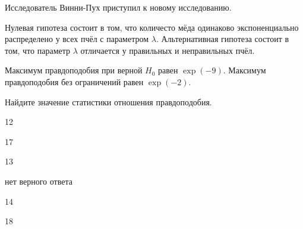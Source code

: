 
\begin{question}
Исследователь Винни-Пух приступил к новому исследованию.

Нулевая гипотеза состоит в том, что количесто мёда одинаково
экспоненциально распределено у всех пчёл с параметром \(\lambda\).
Альтернативная гипотеза состоит в том, что параметр \(\lambda\)
отличается у правильных и неправильных пчёл.

Максимум правдоподобия при верной \(H_0\) равен \(\exp(-9)\). Максимум
правдоподобия без ограничений равен \(\exp(-2)\).

Найдите значение статистики отношения правдоподобия.
\begin{answerlist}
  \item 12
  \item 17
  \item 13
  \item нет верного ответа
  \item 14
  \item 18
\end{answerlist}
\end{question}


